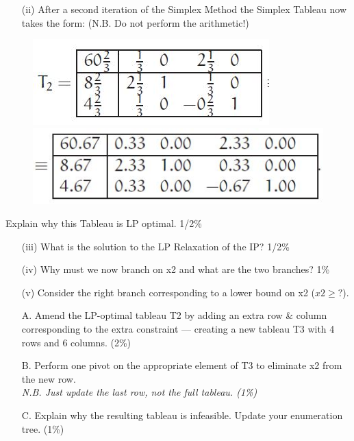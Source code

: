 \documentclass{beamer}
\begin{document}
\begin{frame}
\begin{itemize}
\item[(ii)] After a second iteration of the Simplex Method the Simplex Tableau
now takes the form: (N.B. Do not perform the arithmetic!)
\end{itemize}

\begin{figure}
\centering
\includegraphics[width=0.7\linewidth]{Exam14-d}\\
\includegraphics[width=0.7\linewidth]{Exam14-e}
\end{figure}
\end{frame}
\begin{frame}
	\large
Explain why this Tableau is LP optimal. 1/2\%
\begin{itemize}
\item[(iii)] What is the solution to the LP Relaxation of the IP? 1/2\% \bigskip
\item[(iv)] Why must we now branch on x2 and what are the two branches? 1\%\bigskip
\item[(v)] Consider the right branch corresponding to a lower bound on x2
($x2 \geq ?$).
\end{itemize}

\end{frame}
\begin{frame}
\large
\begin{itemize}
\item[A.] Amend the LP-optimal tableau T2 by adding an extra row \&
column corresponding to the extra constraint — creating a
new tableau T3 with 4 rows and 6 columns. (2\%) \bigskip
\item[B.] Perform one pivot on the appropriate element of T3 to eliminate
x2 from the new row. \\ \textit{N.B. Just update the last row,
not the full tableau. (1\%)}
\bigskip
\item[C.] Explain why the resulting tableau is infeasible. Update your
enumeration tree. (1\%)
\end{itemize}

\end{frame}
\end{document}

